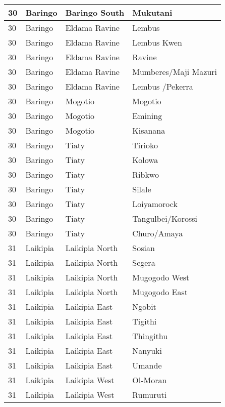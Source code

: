 \begin{table}[!ht]
\begin{tabular}{|l|l|l|l|}
        30 & Baringo & Baringo South & Mukutani \\ \hline
        30 & Baringo & Eldama Ravine & Lembus \\ \hline
        30 & Baringo & Eldama Ravine & Lembus Kwen \\ \hline
        30 & Baringo & Eldama Ravine & Ravine \\ \hline
        30 & Baringo & Eldama Ravine & Mumberes/Maji Mazuri \\ \hline
        30 & Baringo & Eldama Ravine & Lembus /Pekerra \\ \hline
        30 & Baringo & Mogotio & Mogotio \\ \hline
        30 & Baringo & Mogotio & Emining \\ \hline
        30 & Baringo & Mogotio & Kisanana \\ \hline
        30 & Baringo & Tiaty & Tirioko \\ \hline
        30 & Baringo & Tiaty & Kolowa \\ \hline
        30 & Baringo & Tiaty & Ribkwo \\ \hline
        30 & Baringo & Tiaty & Silale \\ \hline
        30 & Baringo & Tiaty & Loiyamorock \\ \hline
        30 & Baringo & Tiaty & Tangulbei/Korossi \\ \hline
        30 & Baringo & Tiaty & Churo/Amaya \\ \hline
        31 & Laikipia & Laikipia North & Sosian \\ \hline
        31 & Laikipia & Laikipia North & Segera \\ \hline
        31 & Laikipia & Laikipia North & Mugogodo West \\ \hline
        31 & Laikipia & Laikipia North & Mugogodo East \\ \hline
        31 & Laikipia & Laikipia East & Ngobit \\ \hline
        31 & Laikipia & Laikipia East & Tigithi \\ \hline
        31 & Laikipia & Laikipia East & Thingithu \\ \hline
        31 & Laikipia & Laikipia East & Nanyuki \\ \hline
        31 & Laikipia & Laikipia East & Umande \\ \hline
        31 & Laikipia & Laikipia West & Ol-Moran \\ \hline
        31 & Laikipia & Laikipia West & Rumuruti \\ \hline

\end{tabular}
\end{table}
